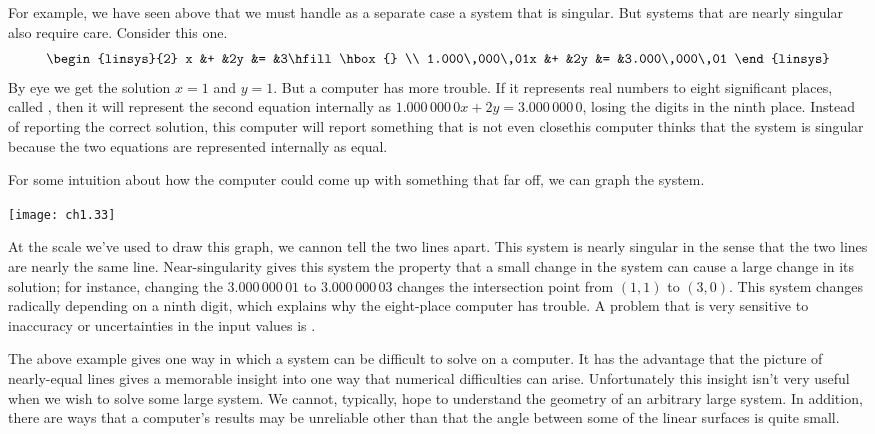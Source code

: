 For example, we have seen above that we must handle as a separate case a
system that is singular.
But systems that are nearly singular also require care.
Consider this one.
\begin{equation*}
   \begin{linsys}{2}
                   x &+ &2y &= &3\hfill\hbox{}  \\
     1.000\,000\,01x &+ &2y &= &3.000\,000\,01
   \end{linsys}
\end{equation*}
By eye we get the solution $x=1$ and $y=1$.
But a computer has more trouble.
If it represents real numbers to eight significant places, called 
, 
then it will represent the second
equation internally as $1.000\,000\,0x+2y=3.000\,000\,0$, losing the
digits in the ninth place.
Instead of reporting the correct solution, this computer will report something
that is not even close\Dash this computer thinks that the system is singular
because the two equations are represented internally as equal.

For some intuition about how the computer could come up with 
something that far
off, we can graph the system.
\begin{center}
  \texttt{[image: ch1.33]}
\end{center}
At the scale we've used to draw this graph, we cannon tell the two lines apart.
This system is nearly singular in the sense that
the two lines are nearly the same line.
Near-singularity gives this system the property that a small change in the
system can cause a large change in its solution; for instance, changing the 
$3.000\,000\,01$ to $3.000\,000\,03$ changes the intersection point
from $(1,1)$ to $(3,0)$.
This system changes radically depending on a ninth digit, which explains why
the eight-place computer has trouble.
A problem that is very sensitive to inaccuracy or uncertainties in
the input values is .

The above example gives one way in which a system can be
difficult to solve on a computer.
It has the advantage that the picture of nearly-equal lines gives a memorable 
insight into one way that numerical difficulties can arise.
Unfortunately this insight isn't very useful when we wish
to solve some large system.
We cannot, typically, hope to understand the geometry of an arbitrary large
system.
In addition, there are ways that a computer's results may be
unreliable other than that the angle between some
of the linear surfaces is quite small.

